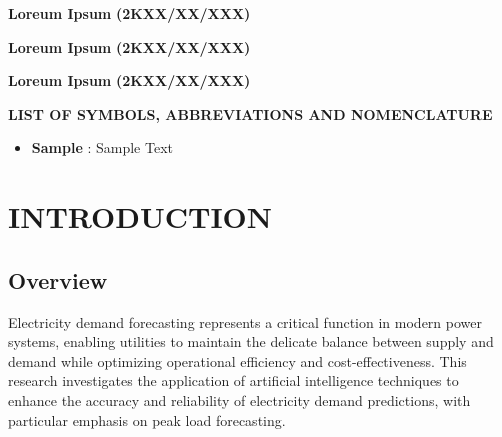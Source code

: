 \documentclass[12pt,a4paper]{report}
\begin{document}
\vspace{2 cm}                        
\begin{multicols}{3}
\centering
\textbf{Loreum Ipsum}
\textbf{(2KXX/XX/XXX)}\\
\vspace{0.3cm}


\textbf{Loreum Ipsum}
\textbf{(2KXX/XX/XXX)}\\
\vspace{0.3cm}


\textbf{Loreum Ipsum}
\textbf{(2KXX/XX/XXX)}\\
\vspace{0.3cm}
\end{multicols}

\tableofcontents %
\newpage
\listoftables


\newpage
\listoffigures
{}



\newpage
\begin{center}
  \textbf{LIST OF SYMBOLS, ABBREVIATIONS AND NOMENCLATURE} 
  \end{center}

\begin{itemize}
  \item[]\textbf{ Sample}  : Sample Text
\end{itemize}

\vspace{2cm}
\begin{center}
  \end{center}


\newpage

\chapter{INTRODUCTION}
\section{Overview}
Electricity demand forecasting represents a critical function in modern power systems, enabling utilities to maintain the delicate balance between supply and demand while optimizing operational efficiency and cost-effectiveness. This research investigates the application of artificial intelligence techniques to enhance the accuracy and reliability of electricity demand predictions, with particular emphasis on peak load forecasting.
\end{document}
